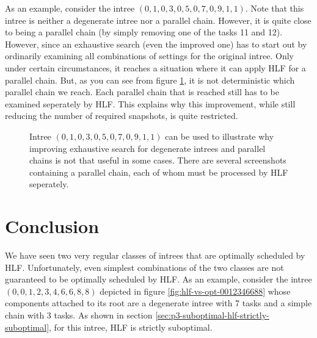 As an example, consider the intree $(0,1,0,3,0,5,0,7,0,9,1,1)$. Note that this intree is neither a degenerate intree nor a parallel chain. However, it is quite close to being a parallel chain (by simply removing one of the tasks 11 and 12). However, since an exhaustive search (even the improved one) has to start out by ordinarily examining all combinations of settings for the original intree. Only under certain circumstances, it reaches a situation where it can apply HLF for a parallel chain. But, as you can see from figure \ref{fig:improving-leaf-not-that-useful-in-some-cases}, it is not deterministic which parallel chain we reach. Each parallel chain that is reached still has to be examined seperately by HLF. This explains why this improvement, while still reducing the number of required snapshots, is quite restricted.

\begin{figure}[th]
  \centering
  \caption{Intree $(0,1,0,3,0,5,0,7,0,9,1,1)$ can be used to illustrate why improving exhaustive search for degenerate intrees and parallel chains is not that useful in some cases. There are several screenshots containing a parallel chain, each of whom must be processed by HLF seperately.}
  \label{fig:improving-leaf-not-that-useful-in-some-cases}
\end{figure}

\section{Conclusion}
\label{sec:properties-schedules-conclusion}

We have seen two very regular classes of intrees that are optimally scheduled by HLF. Unfortunately, even simplest combinations of the two classes are not guaranteed to be optimally scheduled by HLF. As an example, consider the intree $(0,0,1,2,3,4,6,6,8,8)$ depicted in figure \ref{fig:hlf-vs-opt-0012346688} whose components attached to its root are a degenerate intree with 7 tasks and a simple chain with 3 tasks. As shown in section \ref{sec:p3-suboptimal-hlf-strictly-suboptimal}, for this intree, HLF is strictly suboptimal.

